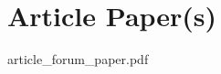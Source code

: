 \ifPubList
	
\fi
\cleardoublepage

\ifVita
	
\fi
\cleardoublepage

\ifIndex
	\printindex
\fi

\chapter{Article Paper(s)}
\label{ch:article_paper}
\cleardoublepage
{
	\ClearWallPaper
	
	{article_forum_paper.pdf}
}
\cleardoublepage

